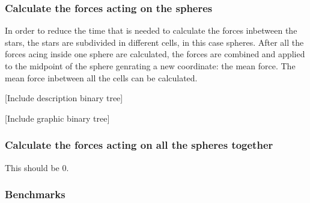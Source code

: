 \subsubsection{Calculate the forces acting on the spheres}

In order to reduce the time that is needed to calculate the forces inbetween
the stars, the stars are subdivided in different cells, in this case spheres.
After all the forces acing inside one sphere are calculated, the forces are
combined and applied to the midpoint of the sphere genrating a new coordinate:
the mean force. The mean force inbetween all the cells can be calculated.

[Include description binary tree]

[Include graphic binary tree]

\subsubsection{Calculate the forces acting on all the spheres together}

This should be 0.

\subsubsection{Benchmarks}

